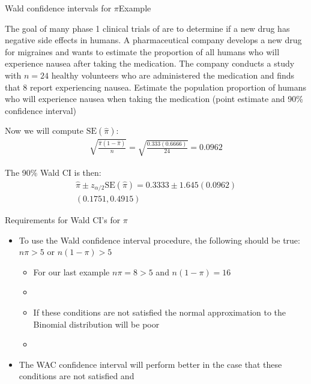 \documentclass[xcolor=dvipsnames]{beamer}
\begin{document}
\begin{frame}{Wald confidence intervals for $\pi$}{Example}
	\begin{itemize} {\tiny
		\item The goal of many phase 1 clinical trials of are to determine if a new drug has negative side effects in humans. A pharmaceutical company develops a new drug for migraines and wants to estimate the proportion of all humans who will experience nausea after taking the medication. The company conducts a study with $n = 24$ healthy volunteers who are administered the medication and finds that 8 report experiencing nausea. Estimate the population proportion of humans who will experience nausea when taking the medication (point estimate and 90\% confidence interval) }
		\item Now we will compute $\text{SE}(\hat{\pi})$:
		\begin{gather*}
		\sqrt{\frac{\hat{\pi}(1-\hat{\pi})}{n}} = \sqrt{\frac{0.333(0.6666)}{24}} = 0.0962
		\end{gather*}
		\item The 90\% Wald CI is then:
		\begin{gather*}
		\hat{\pi} \pm z_{\alpha/2} \text{SE}(\hat{\pi}) = 0.3333 \pm 1.645 ( 0.0962) \\
		(0.1751, 0.4915)
		\end{gather*}
	\end{itemize}
\end{frame}

\begin{frame}{Requirements for Wald CI's for $\pi$}
	\begin{itemize}
		\item To use the Wald confidence interval procedure, the following should be true: $n \pi > 5$ or $n(1-\pi) > 5$
		\begin{itemize}
			\item For our last example $n \pi = 8 > 5$ and $n(1-\pi) = 16$
			\item[]
			\item If these conditions are not satisfied the normal approximation to the Binomial distribution will be poor
			\item[]
		\end{itemize}
		\item The WAC confidence interval will perform better in the case that these conditions are not satisfied and 
	\end{itemize}
\end{frame}
\end{document}
